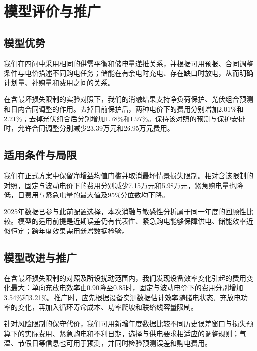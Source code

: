 \section{模型评价与推广}
\subsection{模型优势}
我们在四问中采用相同的供需平衡和储电量递推关系，并根据可用预报、合同调整条件与电价描述不同购电任务；储能在有余电时充电、存在缺口时放电，从而明确计划量、补购量和费用之间的关系。

在含最坏损失限制的实验对照下，我们的消融结果支持净负荷保护、光伏组合预测和日内合同调整的作用。去掉日前保护后，两种电价下的费用分别增加2.01\%和2.21\%；去掉光伏组合后分别增加1.78\%和1.97\%。保持该对照的预测与保护安排时，允许合同调整分别减少23.39万元和26.95万元费用。

\subsection{适用条件与局限}
我们在正式方案中保留净增益均值门槛并取消最坏情景损失限制。相对含该限制的对照，固定与波动电价下的费用分别减少7.15万元和5.98万元，紧急购电量也降低，日费用与紧急电量的最大值及95\%分位数均下降。

2025年数据已参与此前配置选择，本次消融与敏感性分析属于同一年度的回顾性比较。模型的适用前提是近期误差仍有代表性、紧急购电能够保障供电、储能效率近似恒定；跨年度效果需用新增数据检验。

\subsection{模型改进与推广}
在含最坏损失限制的对照及所设扰动范围内，我们发现设备效率变化引起的费用变化最大：单向充放电效率由0.90降至0.85时，固定与波动电价下的费用分别增加3.54\%和3.21\%。推广时，应先根据设备实测数据估计效率随储电状态、充放电功率的变化，再加入循环寿命成本、功率爬坡和联络线容量限制。

针对风险限制的保守代价，我们可用新增年度数据比较不同历史误差窗口与损失预算下的实际费用、紧急购电和不利日期，选择与供电要求相适应的调整规则；气温、节假日等信息也可用于预测，并同时检验预测误差和购电费用。
